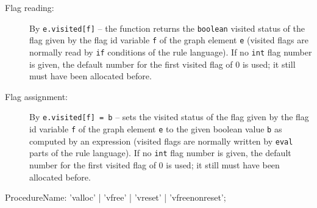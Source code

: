 \begin{description}
\item[Flag reading:] By \texttt{e.visited[f]} -- the function returns the \texttt{boolean} visited status of the flag given by the flag id variable \texttt{f} of the graph element \texttt{e} (visited flags are normally read by \texttt{if} conditions of the rule language).
If no \texttt{int} flag number is given, the default number for the first visited flag of 0 is used; it still must have been allocated before.
\item[Flag assignment:] By \texttt{e.visited[f] = b} -- sets the visited status of the flag given by the flag id variable \texttt{f} of the graph element \texttt{e} to the given boolean value \texttt{b} as computed by an expression
(visited flags are normally written by \texttt{eval} parts of the rule language).
If no \texttt{int} flag number is given, the default number for the first visited flag of 0 is used; it still must have been allocated before.
\end{description}

\begin{rail}
  ProcedureName: 'valloc' | 'vfree' | 'vreset' | 'vfreenonreset';
\end{rail}

